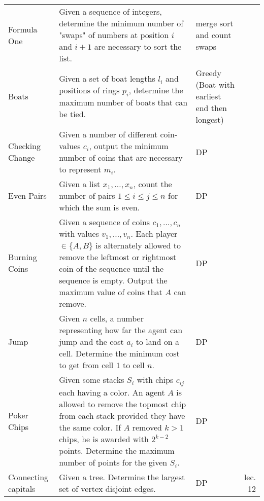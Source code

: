 \documentclass[a4paper, 10pt]{article}
\begin{document}
\begin{longtable}{ L{2cm} L{8cm} L{4cm} r}
        Formula One 
        & Given a sequence of integers, determine the minimum number of "swaps" of numbers at position $i$ and $i+1$ are necessary to sort the list. 
        & merge sort and count swaps &  \pageref{sec:formula_one} \\

        Boats 
        & Given a set of boat lengths $l_i$ and positions of rings $p_i$, determine the maximum number of boats that can be tied.
        & Greedy (Boat with earliest end then longest) &  \pageref{sec:boats} \\

        Checking Change 
        & Given a number of different coin-values $c_i$, 
            output the minimum number of coins that are necessary to represent $m_i$.
        & DP       & \pageref{sec:checking_change} \\

        Even Pairs 
        & Given a list $x_1,\dots,x_n$, count the number of pairs $1\leq i\leq j \leq n$ for which 
            the sum is even.
        & DP &  \pageref{sec:even_pairs} \\

        Burning Coins 
        & Given a sequence of coins $c_1, \dots, c_n$ with values $v_1,\dots,v_n$. 
            Each player $\in \{A,B\}$ is alternately allowed to remove the leftmost or rightmost coin of the sequence until the sequence is empty. 
            Output the maximum value of coins that $A$ can remove. 
        & DP &  \pageref{sec:burning_coins} \\

        Jump 
        & Given $n$ cells, a number representing how far the agent can jump and the cost $a_i$ to land on a cell. 
            Determine the minimum cost to get from cell $1$ to cell $n$.        
        & DP &  \pageref{sec:jump} \\

        Poker Chips 
        & Given some stacks $S_i$ with chips $c_{ij}$ each having a color. 
            An agent $A$ is allowed to remove the topmost chip from each stack provided they have the same color.
            If $A$ removed $k>1$ chips, he is awarded with $2^{k-2}$ points. 
            Determine the maximum number of points for the given $S_i$.          
            & DP &  \pageref{sec:poker_chips} \\

        Connecting capitals 
        & Given a tree. 
        Determine the largest set of vertex disjoint edges.
        & DP &  lec. 12 \\


\end{longtable}
\end{document}
